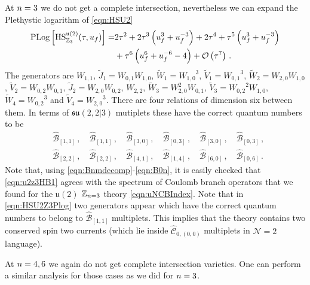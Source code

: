 \documentclass[main.tex]{subfiles}
\begin{document}
At ${n}=3$ we do not get a complete intersection, nevertheless we can expand the Plethystic logarithm of \eqref{eqn:HSU2}
\begin{equation}\label{eqn:HSU2Z3Plog}
\begin{aligned}
\operatorname{\mathrm{PLog}}\left[\textrm{HS}_{\mathbb{Z}_3}^{\mathfrak{u}(2)}(\tau,u_f)\right]=&2 \tau^2+2 \tau^3 \left(u_f^3+u_f^{-3}\right)+2 \tau^4+\tau^5 \left(u_f^3+u_f^{-3}\right)\\
&+\tau^6
   \left(u_f^6+u_f^{-6}-4\right)+\mathcal{O}\left(\tau^7\right)\,.
  \end{aligned}
\end{equation}
The generators are $W_{1,1}$, $\widetilde{J}_1=W_{0,1}W_{1,0}$, $\widetilde{W}_1={W_{1,0}}^3$, $\widetilde{V}_1={W_{0,1}}^3$, $\widetilde{W}_2=W_{2,0}W_{1,0}$, $\widetilde{V}_2=W_{0,2}W_{0,1}$, $\widetilde{J}_2=W_{2,0}W_{0,2}$, $W_{2,2}$, $\widetilde{W}_3=W_{2,0}^2W_{0,1}$, $\widetilde{V}_3={W_{0,2}}^2W_{1,0}$, $\widetilde{W}_4={W_{0,2}}^3$ and $\widetilde{V}_4={W_{2,0}}^3$. There are four relations of dimension six between them. In terms of $\mathfrak{su}(2,2|3)$ mutiplets these have the correct quantum numbers to be
\begin{equation}
\begin{aligned}\label{eqn:u2z3HB1}
&\hat{\mathcal{B}}_{[1,1]}\,,\quad \hat{\mathcal{B}}_{[1,1]}\,,\quad \hat{\mathcal{B}}_{[3,0]} \,,\quad {\hat{\mathcal{B}}_{[0,3]}}\,,\quad \hat{\mathcal{B}}_{[3,0]} \,,\quad {\hat{\mathcal{B}}_{[0,3]}}\,,\\ &{\hat{\mathcal{B}}_{[2,2]}}\,,\quad {\hat{\mathcal{B}}_{[2,2]}}\,,\quad {\hat{\mathcal{B}}_{[4,1]}}\,,\quad {\hat{\mathcal{B}}_{[1,4]}}\,,\quad {\hat{\mathcal{B}}_{[6,0]}}\,,\quad {\hat{\mathcal{B}}_{[0,6]}}\,.
\end{aligned}
\end{equation}
Note that, using \eqref{eqn:Bnmdecomp}-\eqref{eqn:B0n}, it is easily checked that \eqref{eqn:u2z3HB1} agrees with the spectrum of Coulomb branch operators that we found for the $\mathfrak{u}(2)$ $\mathbb{Z}_{n=3}$ theory \eqref{eqn:uNCBIndex}. Note that in \eqref{eqn:HSU2Z3Plog} two generators appear which have the correct quantum numbers to belong to $\hat{\mathcal{B}}_{[1,1]}$ multiplets. This implies that the theory contains two conserved spin two currents (which lie inside $\hat{\mathcal{C}}_{0,(0,0)}$ multiplets in $\mathcal{N}=2$ language).

At ${n}=4,6$ we again do not get complete intersection varieties. One can perform a similar analysis for those cases as we did for ${n}=3$. 
\end{document}
